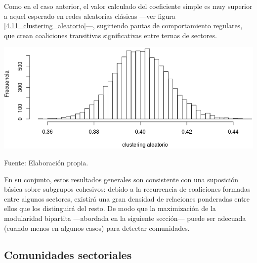 \documentclass[letterpaper, 11pt]{book}
\theoremstyle{definition}
\theoremstyle{remark}
\begin{document}
Como en el caso anterior, el valor calculado del coeficiente simple es muy superior a aquel esperado en redes aleatorias clásicas ---ver figura \ref{4.11_clustering_aleatorio}---, sugiriendo pautas de comportamiento regulares, que crean coaliciones transitivas significativas entre ternas de sectores. 


\hspace{-1em}\begin{minipage}{\linewidth}
\centering
{} \label{4.11_clustering_aleatorio}
\includegraphics[scale=0.67]{img/4.11_clustering_aleatorio.png}
\par\bigskip
\small Fuente: Elaboración propia.
\end{minipage}\bigskip

En su conjunto, estos resultados generales son consistente con una suposición básica sobre subgrupos cohesivos: debido a la recurrencia de coaliciones formadas entre algunos sectores, existirá una gran densidad de relaciones ponderadas entre ellos que los distinguirá del resto. 
De modo que la maximización de la modularidad bipartita ---abordada en la siguiente sección--- puede ser adecuada (cuando menos en algunos casos) para detectar comunidades. 






\subsection{Comunidades sectoriales}
\label{subsec:Comunidades_TiposEps}
\end{document}
